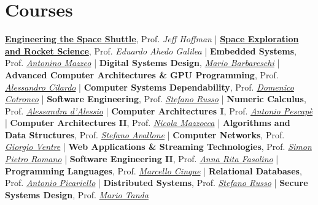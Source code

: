 \documentclass[letterpaper]{twentysecondcv} %
\begin{document}
\section{Courses}

\href{https://www.edx.org/course/engineering-the-space-shuttle}{\textbf{Engineering the Space Shuttle}}, Prof. \textit{Jeff Hoffman} |
\href{https://www.edx.org/course/the-conquest-of-space-space-exploration-and-rocket}{\textbf{Space Exploration and Rocket Science}}, Prof. \textit{Eduardo Ahedo Galilea} |
\textbf{Embedded Systems}, Prof. \href{https://www.docenti.unina.it/antonino.mazzeo}{\textit{Antonino Mazzeo}} |
\textbf{Digital Systems Design}, \href{https://www.researchgate.net/profile/Mario_Barbareschi}{\textit{Mario Barbareschi}} |
\textbf{Advanced Computer Architectures \& GPU Programming}, Prof. \href{https://www.docenti.unina.it/alessandro.cilardo}{\textit{Alessandro Cilardo}} |
\textbf{Computer Systems Dependability}, Prof. \href{https://www.docenti.unina.it/domenico.cotroneo}{\textit{Domenico Cotroneo}} |
\textbf{Software Engineering}, Prof. \href{https://www.docenti.unina.it/stefano.russo}{\textit{Stefano Russo}} |
\textbf{Numeric Calculus}, Prof. \href{https://www.docenti.unina.it/alessandra.dalessio}{\textit{Alessandra d'Alessio}} |
\textbf{Computer Architectures I}, Prof. \href{https://www.docenti.unina.it/antonio.pescape}{\textit{Antonio Pescapè}} |
\textbf{Computer Architectures II}, Prof. \href{https://www.docenti.unina.it/nicola.mazzocca}{\textit{Nicola Mazzocca}} |
\textbf{Algorithms and Data Structures}, Prof. \href{https://www.docenti.unina.it/stefano.avallone}{\textit{Stefano Avallone}} |
\textbf{Computer Networks}, Prof. \href{https://www.docenti.unina.it/giorgio.ventre}{\textit{Giorgio Ventre}} |
\textbf{Web Applications \& Streaming Technologies}, Prof. \href{https://www.docenti.unina.it/simonpietro.romano}{\textit{Simon Pietro Romano}} |
\textbf{Software Engineering II}, Prof. \href{https://www.docenti.unina.it/annarita.fasolino}{\textit{Anna Rita Fasolino}} |
\textbf{Programming Languages}, Prof. \href{https://www.docenti.unina.it/marcello.cinque}{\textit{Marcello Cinque}} |
\textbf{Relational Databases}, Prof. \href{https://www.docenti.unina.it/antonio.picariello}{\textit{Antonio Picariello}} |
\textbf{Distributed Systems}, Prof. \href{https://www.docenti.unina.it/stefano.russo}{\textit{Stefano Russo}} |
\textbf{Secure Systems Design}, Prof. \href{ttps://www.docenti.unina.it/mario.tanda}{\textit{Mario Tanda}}
\end{document}

